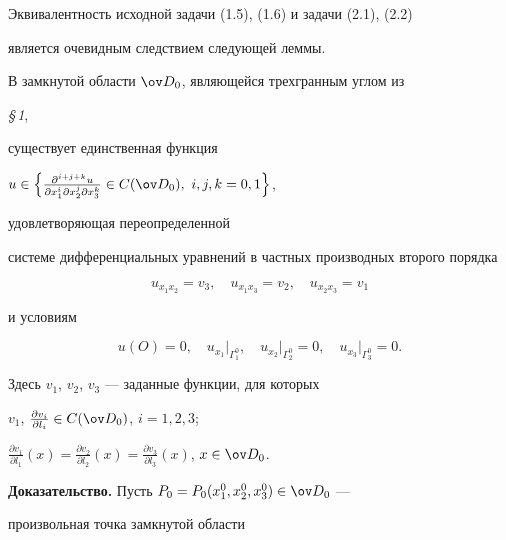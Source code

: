 Эквивалентность исходной задачи (1.5), (1.6) и задачи (2.1), (2.2)


является очевидным следствием следующей леммы.





\begin{lems}


В замкнутой области $\ov D_0$, являющейся трехгранным углом из


{\em \S\,1},


существует единственная функция


$u\in\left\{\frac{\partial^{i+j+k}u}{\partial x^i_1\partial x^j_2


\partial x^k_3}\in C(\ov D_0),\ i,j,k=0,1\right\}$,


удовлетворяющая переопределенной


системе дифференциальных уравнений в частных производных второго порядка


\begin{equation}


u_{x_1x_2}=v_3,\quad u_{x_1x_3}=v_2,\quad u_{x_2x_3}=v_1


\end{equation}


и условиям


\begin{equation}


u(O)=0,\quad u_{x_1}\big|_{\Gamma^0_1},\quad


u_{x_2}\big|_{\Gamma^0_2}=0,\quad


u_{x_3}\big|_{\Gamma^0_3}=0.


\end{equation}


Здесь $v_1$, $v_2$, $v_3$ --- заданные функции, для которых


$v_1$, $\frac{\partial v_i}{\partial l_i}\in C(\ov D_0)$, $i=1,2,3$;


$\frac{\partial v_1}{\partial l_1}(x)=


\frac{\partial v_2}{\partial l_2}(x)=


\frac{\partial v_3}{\partial l_3}(x)$, $x\in\ov D_0$.


\end{lems}





{\bf Доказательство.} Пусть $P_0=P_0(x^0_1,x^0_2,x^0_3)\in\ov D_0$ ---


произвольная точка замкнутой области


